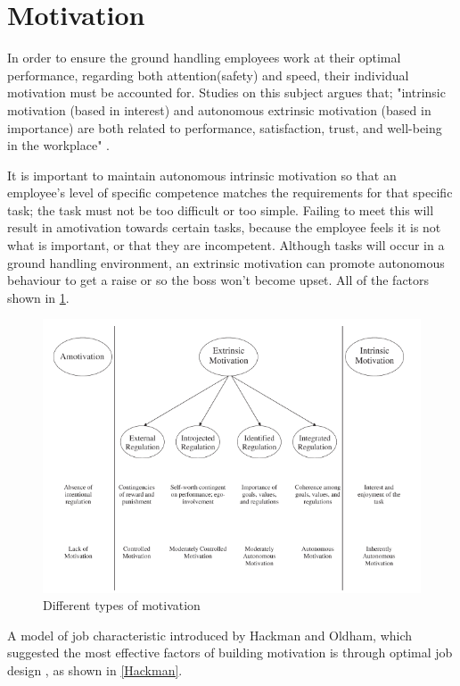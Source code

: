 \section{Motivation}

In order to ensure the ground handling employees work at their optimal performance, regarding both attention(safety) and speed, their individual motivation must be accounted for. Studies on this subject argues that; "intrinsic motivation (based in interest) and autonomous extrinsic motivation (based in importance) are both related to performance, satisfaction, trust, and well-being in the workplace" \cite{GAGNE}.

It is important to maintain autonomous intrinsic motivation so that an employee's level of specific competence matches the requirements for that specific task; the task must not be too difficult or too simple. Failing to meet this will result in amotivation towards certain tasks, because the employee feels it is not what is important, or that they are incompetent. Although tasks will occur in a ground handling environment, an extrinsic motivation can promote autonomous behaviour to get a raise or so the boss won't become upset. All of the factors shown in \ref{Movation}.

\begin{figure}
\centering
\includegraphics[width=\textwidth]{Grafik/Motivation}
\caption{Different types of motivation}
\label{Movation}
\end{figure}

A model of job characteristic introduced by Hackman and Oldham, which suggested the most effective factors of building motivation is through optimal job design \cite{HACKMAN}, as shown in \ref{Hackman}.

